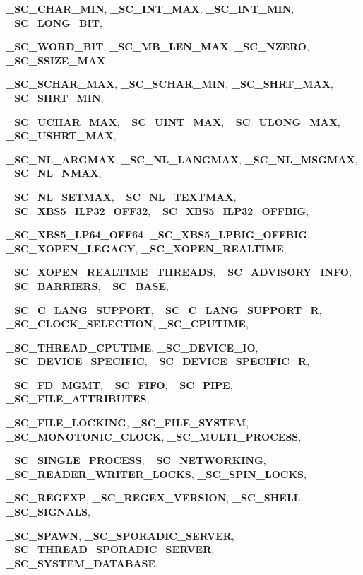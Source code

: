 \begin{DoxyCompactItemize}
{\bf \_\-SC\_\-CHAR\_\-MIN}, 
{\bf \_\-SC\_\-INT\_\-MAX}, 
{\bf \_\-SC\_\-INT\_\-MIN}, 
{\bf \_\-SC\_\-LONG\_\-BIT}, 
\par
{\bf \_\-SC\_\-WORD\_\-BIT}, 
{\bf \_\-SC\_\-MB\_\-LEN\_\-MAX}, 
{\bf \_\-SC\_\-NZERO}, 
{\bf \_\-SC\_\-SSIZE\_\-MAX}, 
\par
{\bf \_\-SC\_\-SCHAR\_\-MAX}, 
{\bf \_\-SC\_\-SCHAR\_\-MIN}, 
{\bf \_\-SC\_\-SHRT\_\-MAX}, 
{\bf \_\-SC\_\-SHRT\_\-MIN}, 
\par
{\bf \_\-SC\_\-UCHAR\_\-MAX}, 
{\bf \_\-SC\_\-UINT\_\-MAX}, 
{\bf \_\-SC\_\-ULONG\_\-MAX}, 
{\bf \_\-SC\_\-USHRT\_\-MAX}, 
\par
{\bf \_\-SC\_\-NL\_\-ARGMAX}, 
{\bf \_\-SC\_\-NL\_\-LANGMAX}, 
{\bf \_\-SC\_\-NL\_\-MSGMAX}, 
{\bf \_\-SC\_\-NL\_\-NMAX}, 
\par
{\bf \_\-SC\_\-NL\_\-SETMAX}, 
{\bf \_\-SC\_\-NL\_\-TEXTMAX}, 
{\bf \_\-SC\_\-XBS5\_\-ILP32\_\-OFF32}, 
{\bf \_\-SC\_\-XBS5\_\-ILP32\_\-OFFBIG}, 
\par
{\bf \_\-SC\_\-XBS5\_\-LP64\_\-OFF64}, 
{\bf \_\-SC\_\-XBS5\_\-LPBIG\_\-OFFBIG}, 
{\bf \_\-SC\_\-XOPEN\_\-LEGACY}, 
{\bf \_\-SC\_\-XOPEN\_\-REALTIME}, 
\par
{\bf \_\-SC\_\-XOPEN\_\-REALTIME\_\-THREADS}, 
{\bf \_\-SC\_\-ADVISORY\_\-INFO}, 
{\bf \_\-SC\_\-BARRIERS}, 
{\bf \_\-SC\_\-BASE}, 
\par
{\bf \_\-SC\_\-C\_\-LANG\_\-SUPPORT}, 
{\bf \_\-SC\_\-C\_\-LANG\_\-SUPPORT\_\-R}, 
{\bf \_\-SC\_\-CLOCK\_\-SELECTION}, 
{\bf \_\-SC\_\-CPUTIME}, 
\par
{\bf \_\-SC\_\-THREAD\_\-CPUTIME}, 
{\bf \_\-SC\_\-DEVICE\_\-IO}, 
{\bf \_\-SC\_\-DEVICE\_\-SPECIFIC}, 
{\bf \_\-SC\_\-DEVICE\_\-SPECIFIC\_\-R}, 
\par
{\bf \_\-SC\_\-FD\_\-MGMT}, 
{\bf \_\-SC\_\-FIFO}, 
{\bf \_\-SC\_\-PIPE}, 
{\bf \_\-SC\_\-FILE\_\-ATTRIBUTES}, 
\par
{\bf \_\-SC\_\-FILE\_\-LOCKING}, 
{\bf \_\-SC\_\-FILE\_\-SYSTEM}, 
{\bf \_\-SC\_\-MONOTONIC\_\-CLOCK}, 
{\bf \_\-SC\_\-MULTI\_\-PROCESS}, 
\par
{\bf \_\-SC\_\-SINGLE\_\-PROCESS}, 
{\bf \_\-SC\_\-NETWORKING}, 
{\bf \_\-SC\_\-READER\_\-WRITER\_\-LOCKS}, 
{\bf \_\-SC\_\-SPIN\_\-LOCKS}, 
\par
{\bf \_\-SC\_\-REGEXP}, 
{\bf \_\-SC\_\-REGEX\_\-VERSION}, 
{\bf \_\-SC\_\-SHELL}, 
{\bf \_\-SC\_\-SIGNALS}, 
\par
{\bf \_\-SC\_\-SPAWN}, 
{\bf \_\-SC\_\-SPORADIC\_\-SERVER}, 
{\bf \_\-SC\_\-THREAD\_\-SPORADIC\_\-SERVER}, 
{\bf \_\-SC\_\-SYSTEM\_\-DATABASE}, 

\end{DoxyCompactItemize}
